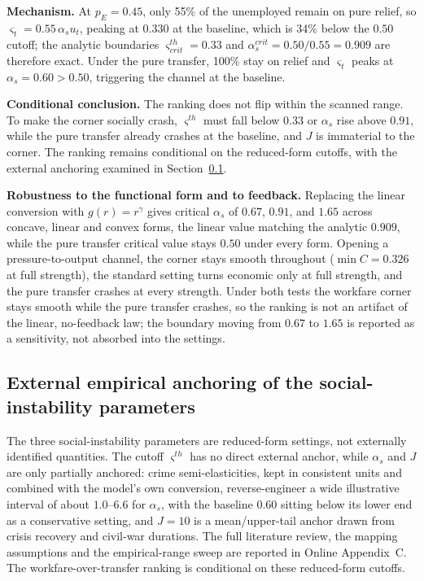 \documentclass[review,12pt]{elsarticle}
\theoremstyle{plain}
\theoremstyle{definition}
\theoremstyle{remark}
\begin{document}
\noindent\textbf{Mechanism.} At $p_E=0.45$, only 55\% of the unemployed remain on pure relief, so $\varsigma_t=0.55\,\alpha_s u_t$, peaking at $0.330$ at the baseline, which is 34\% below the $0.50$ cutoff; the analytic boundaries $\varsigma^{th}_{crit}=0.33$ and $\alpha_s^{crit}=0.50/0.55=0.909$ are therefore exact. Under the pure transfer, 100\% stay on relief and $\varsigma_t$ peaks at $\alpha_s=0.60>0.50$, triggering the channel at the baseline.

\noindent\textbf{Conditional conclusion.} The ranking does not flip within the scanned range. To make the corner socially crash, $\varsigma^{th}$ must fall below $0.33$ or $\alpha_s$ rise above $0.91$, while the pure transfer already crashes at the baseline, and $J$ is immaterial to the corner. The ranking remains conditional on the reduced-form cutoffs, with the external anchoring examined in Section~\ref{sec:social-anchor}.

\noindent\textbf{Robustness to the functional form and to feedback.} Replacing the linear conversion with $g(r)=r^\gamma$ gives critical $\alpha_s$ of $0.67$, $0.91$, and $1.65$ across concave, linear and convex forms, the linear value matching the analytic $0.909$, while the pure transfer critical value stays $0.50$ under every form. Opening a pressure-to-output channel, the corner stays smooth throughout ($\min C=0.326$ at full strength), the standard setting turns economic only at full strength, and the pure transfer crashes at every strength. Under both tests the workfare corner stays smooth while the pure transfer crashes, so the ranking is not an artifact of the linear, no-feedback law; the boundary moving from $0.67$ to $1.65$ is reported as a sensitivity, not absorbed into the settings.

\subsection{External empirical anchoring of the social-instability parameters}
\label{sec:social-anchor}

The three social-instability parameters are reduced-form settings, not
externally identified quantities. The cutoff $\varsigma^{th}$ has no direct
external anchor, while $\alpha_s$ and $J$ are only partially anchored:
crime semi-elasticities, kept in consistent units and combined with the
model's own conversion, reverse-engineer a wide illustrative interval of
about $1.0$--$6.6$ for $\alpha_s$, with the baseline $0.60$ sitting below
its lower end as a conservative setting, and $J=10$ is a mean/upper-tail
anchor drawn from crisis recovery and civil-war durations. The full
literature review, the mapping assumptions and the empirical-range sweep are
reported in Online Appendix~C. The workfare-over-transfer ranking is
conditional on these reduced-form cutoffs.
\end{document}
